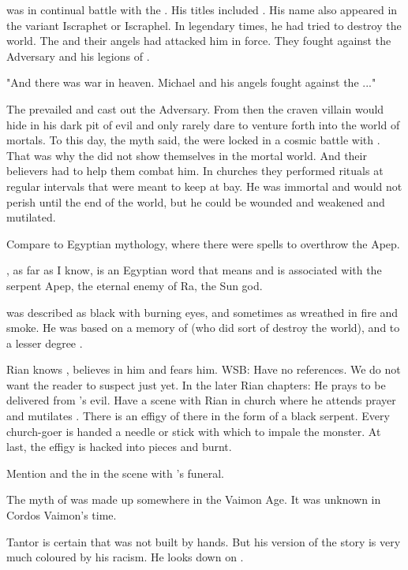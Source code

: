 \Isphet was in continual battle with the \sephiroth.
His titles included .
His name also appeared in the variant Iscraphet or Iscraphel. 
In legendary times, he had tried to destroy the world. 
The \sephiroth and their angels had attacked him in force. 
They fought against the Adversary and his legions of \qliphoth. 

"And there was war in heaven. Michael and his angels fought against the \Dragon..."

The \sephiroth prevailed and cast out the Adversary. 
From then the craven villain would hide in his dark pit of evil and only rarely dare to venture forth into the world of mortals. 
To this day, the myth said, the \sephiroth were locked in a cosmic battle with \Isphet. 
That was why the \sephiroth did not show themselves in the mortal world. 
And their believers had to help them combat him. 
In churches they performed rituals at regular intervals that were meant to keep \Isphet at bay.
He was immortal and would not perish until the end of the world, but he could be wounded and weakened and mutilated.

Compare to Egyptian mythology, where there were spells to overthrow the \dragon Apep. 

, as far as I know, is an Egyptian word that means  and is associated with the serpent Apep, the eternal enemy of Ra, the Sun god. 

\Isphet was described as black with burning eyes, and sometimes as wreathed in fire and smoke. 
He was based on a memory of \Ishnaruchaefir (who did sort of destroy the world), and to a lesser degree \Secherdamon.

Rian knows \Isphet, believes in him and fears him. 
WSB: Have no \Isphet references. We do not want the reader to suspect just yet. 
In the later Rian chapters: He prays to be delivered from \Isphet's evil. 
Have a scene with Rian in church where he attends prayer and mutilates \Isphet. 
There is an effigy of \Isphet there in the form of a black serpent. 
Every church-goer is handed a needle or stick with which to impale the monster. 
At last, the effigy is hacked into pieces and burnt. 

Mention \Isphet and the \qliphoth in the scene with \Icor's funeral. 

The myth of \Isphet was made up somewhere in the Vaimon Age. It was unknown in Cordos Vaimon's time. 



Tantor is certain that \EreshKal was not built by \meccaran hands. 
But his version of the story is very much coloured by his racism. 
He looks down on \meccara. 

